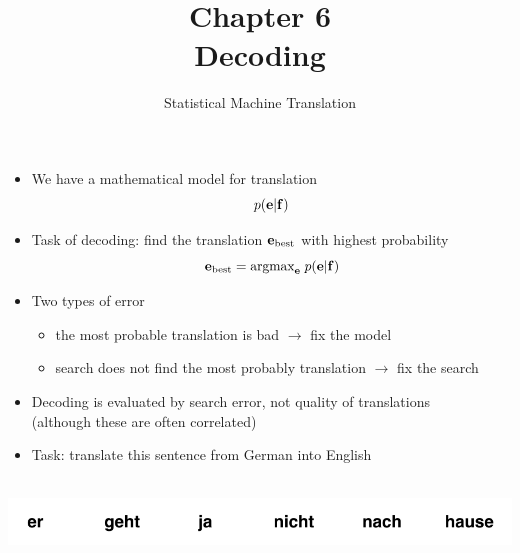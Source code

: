 \documentclass[landscape]{slides}
\newcommand{\maths}[1]{\textcolor{purple}{#1}}
\begin{document}
\title[Chapter 6: Decoding]{Chapter 6\\[1cm] Decoding}
\author[Philipp Koehn]{}
\date{Statistical Machine Translation}

\maketitle


\begin{itemize}
\item We have a mathematical model for translation \vspace{-5mm}
\maths{\begin{equation*}
p({\bf e}|{\bf f})\vspace{-20mm}
\end{equation*}}
\item Task of decoding: find the translation \maths{${\bf e}_\text{best}$} with highest probability\vspace{-5mm}
\maths{\begin{equation*}
{\bf e}_\text{best} = \text{argmax}_{\bf e} \; p({\bf e}|{\bf f})\vspace{-20mm}
\end{equation*}}
\item Two types of error
\begin{itemize}
\item the most probable translation is bad $\rightarrow$ fix the model
\item search does not find the most probably translation $\rightarrow$ fix the search
\end{itemize}
\item Decoding is evaluated by search error, not quality of translations\\
(although these are often correlated)
\end{itemize}


\begin{itemize} \vspace{10mm}
\item Task: translate this sentence from German into English\vspace{4mm}
\end{itemize} 
\begin{center}
$\;$ $\;$ $\;\;$ \includegraphics[scale=1.5]{translation-step1.pdf}
\end{center}
\end{document}
